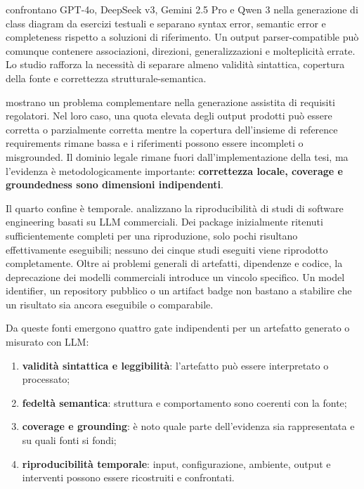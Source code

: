 \documentclass[12pt,a4paper,oneside]{report}
\begin{document}
\citet{garaccione2025llmcomparison} confrontano GPT-4o, DeepSeek v3, Gemini 2.5 Pro e Qwen 3 nella generazione di class diagram da esercizi testuali e separano syntax error, semantic error e completeness rispetto a soluzioni di riferimento. Un output parser-compatible può comunque contenere associazioni, direzioni, generalizzazioni e molteplicità errate. Lo studio rafforza la necessità di separare almeno validità sintattica, copertura della fonte e correttezza strutturale-semantica.

\citet{abualhaija2025regulatory} mostrano un problema complementare nella generazione assistita di requisiti regolatori. Nel loro caso, una quota elevata degli output prodotti può essere corretta o parzialmente corretta mentre la copertura dell'insieme di reference requirements rimane bassa e i riferimenti possono essere incompleti o misgrounded. Il dominio legale rimane fuori dall'implementazione della tesi, ma l'evidenza è metodologicamente importante: \textbf{correttezza locale, coverage e groundedness sono dimensioni indipendenti}.

Il quarto confine è temporale. \citet{angermeir2026reproducibility} analizzano la riproducibilità di studi di software engineering basati su LLM commerciali. Dei package inizialmente ritenuti sufficientemente completi per una riproduzione, solo pochi risultano effettivamente eseguibili; nessuno dei cinque studi eseguiti viene riprodotto completamente. Oltre ai problemi generali di artefatti, dipendenze e codice, la deprecazione dei modelli commerciali introduce un vincolo specifico. Un model identifier, un repository pubblico o un artifact badge non bastano a stabilire che un risultato sia ancora eseguibile o comparabile.

Da queste fonti emergono quattro gate indipendenti per un artefatto generato o misurato con LLM:

\begin{enumerate}[label=\arabic*.]
\item \textbf{validità sintattica e leggibilità}: l'artefatto può essere interpretato o processato;
\item \textbf{fedeltà semantica}: struttura e comportamento sono coerenti con la fonte;
\item \textbf{coverage e grounding}: è noto quale parte dell'evidenza sia rappresentata e su quali fonti si fondi;
\item \textbf{riproducibilità temporale}: input, configurazione, ambiente, output e interventi possono essere ricostruiti e confrontati.
\end{enumerate}
\end{document}
